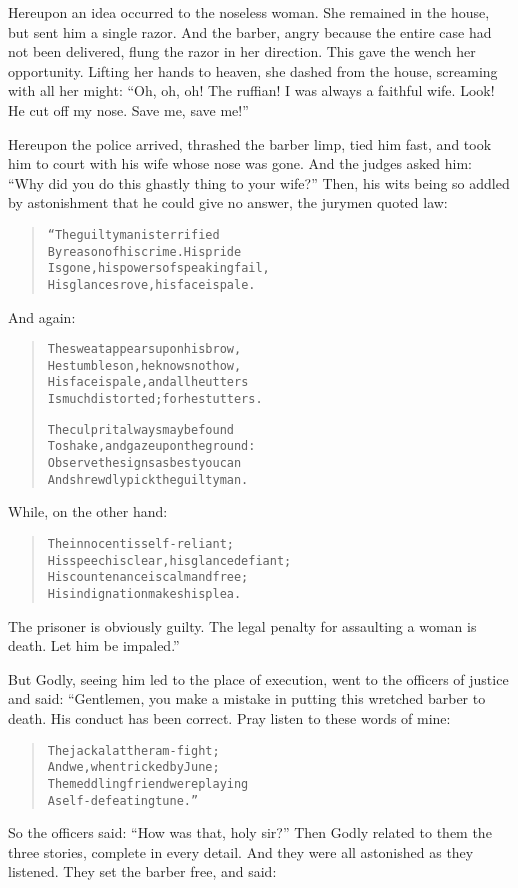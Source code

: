 \documentclass[article, twoside, 14pt]{memoir}
\renewenvironment{verbatim}{%
\begin{quote}%
\vskip -10pt%
\begin{alltt}\normalfont\large}{\end{alltt}%
\end{quote}%
\vskip -10pt
} %
\begin{document}
Hereupon an idea occurred to the noseless woman. She remained in
the house, but sent him a single razor. And the barber, angry
because the entire case had not been delivered, flung the razor in
her direction. This gave the wench her opportunity. Lifting her
hands to heaven, she dashed from the house, screaming with all her
might:
``Oh, oh, oh! The ruffian! I was always a faithful wife. Look! He cut off my nose. Save me, save me!''

Hereupon the police arrived, thrashed the barber limp, tied him
fast, and took him to court with his wife whose nose was gone. And
the judges asked him:
``Why did you do this ghastly thing to your wife?'' Then, his wits
being so addled by astonishment that he could give no answer, the
jurymen quoted law:

\begin{verbatim}
“The guilty man is terrified
By reason of his crime. His pride
Is gone, his powers of speaking fail,
His glances rove, his face is pale.
\end{verbatim}
And again:

\begin{verbatim}
The sweat appears upon his brow,
He stumbles on, he knows not how,
His face is pale, and all he utters
Is much distorted; for he stutters.

The culprit always may be found
To shake, and gaze upon the ground:
Observe the signs as best you can
And shrewdly pick the guilty man.
\end{verbatim}
While, on the other hand:

\begin{verbatim}
The innocent is self-reliant;
His speech is clear, his glance defiant;
His countenance is calm and free;
His indignation makes his plea.
\end{verbatim}
The prisoner is obviously guilty. The legal penalty for assaulting
a woman is death. Let him be impaled.”

But Godly, seeing him led to the place of execution, went to the
officers of justice and said: “Gentlemen, you make a mistake in
putting this wretched barber to death. His conduct has been
correct. Pray listen to these words of mine:

\begin{verbatim}
The jackal at the ram-fight;
And we, when tricked by June;
The meddling friend{\textemdash}were playing
A self-defeating tune.”
\end{verbatim}
So the officers said: ``How was that, holy sir?'' Then Godly
related to them the three stories, complete in every detail. And
they were all astonished as they listened. They set the barber
free, and said:
\end{document}

